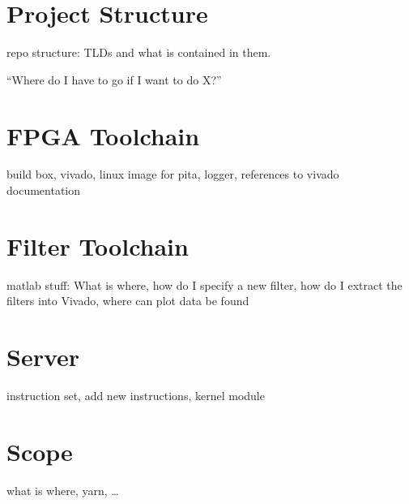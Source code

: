 \chapter{Project Structure} %
\label{ch:devguide:project_structure}

repo structure: TLDs and what is contained in them.

``Where do I have to go if I want to do X?''

\chapter{FPGA Toolchain} %
\label{ch:devguide:fpga_toolchain}
build box, vivado, linux image for pita, logger,
references to vivado documentation

\chapter{Filter Toolchain} %
\label{ch:devguide:fpga_toolchain}
matlab stuff: What is where,  how do I specify a new filter,  how do I extract
the filters into Vivado, where can plot data be found

\chapter{Server} %
\label{ch:devguide:server}
instruction set, add new instructions, kernel module

\chapter{Scope} %
\label{ch:devguide:scope}
what is where, yarn, \ldots


